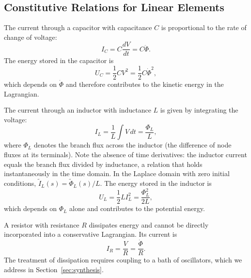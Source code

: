 \documentclass[reprint, floatfix, superscriptaddress, amsmath, amssymb, longbibliography]{revtex4-2}
\begin{document}
\subsection{Constitutive Relations for Linear Elements}
\label{sec:linear_elements}

The current through a capacitor with capacitance $C$ is proportional to the rate of change of voltage:
\begin{equation}
I_C = C\frac{dV}{dt} = C\ddot{\Phi}.
\label{eq:capacitor_current}
\end{equation}
The energy stored in the capacitor is
\begin{equation}
U_C = \frac{1}{2}CV^2 = \frac{1}{2}C\dot{\Phi}^2,
\label{eq:capacitor_energy}
\end{equation}
which depends on $\dot{\Phi}$ and therefore contributes to the kinetic energy in the Lagrangian.

The current through an inductor with inductance $L$ is given by integrating the voltage:
\begin{equation}
I_L = \frac{1}{L}\int V \, dt = \frac{\Phi_L}{L},
\label{eq:inductor_current}
\end{equation}
where $\Phi_L$ denotes the branch flux across the inductor (the difference of node fluxes at its terminals). Note the absence of time derivatives: the inductor current equals the branch flux divided by inductance, a relation that holds instantaneously in the time domain. In the Laplace domain with zero initial conditions, $\tilde{I}_L(s) = \tilde{\Phi}_L(s)/L$.
The energy stored in the inductor is
\begin{equation}
U_L = \frac{1}{2}LI_L^2 = \frac{\Phi_L^2}{2L},
\label{eq:inductor_energy}
\end{equation}
which depends on $\Phi_L$ alone and contributes to the potential energy.

A resistor with resistance $R$ dissipates energy and cannot be directly incorporated into a conservative Lagrangian. Its current is
\begin{equation}
I_R = \frac{V}{R} = \frac{\dot{\Phi}}{R}.
\label{eq:resistor_current}
\end{equation}
The treatment of dissipation requires coupling to a bath of oscillators, which we address in Section~\ref{sec:synthesis}.
\end{document}
